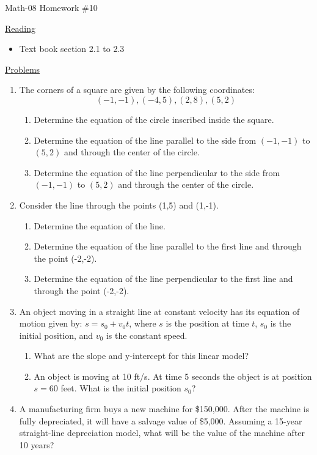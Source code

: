 \documentclass[letterpaper,12pt,fleqn]{article}
\begin{document}
\begin{center}
\Large Math-08 Homework \#10
\end{center}

\vspace{0.5in}

\underline{Reading}

\begin{itemize}
\item Text book section 2.1 to 2.3
\end{itemize}

\underline{Problems}

\begin{enumerate}
\item The corners of a square are given by the following coordinates:
  \[(-1,-1), (-4,5), (2,8), (5,2)\]
  \begin{enumerate}
  \item Determine the equation of the circle inscribed inside the square.
  \item Determine the equation of the line parallel to the side from
    $(-1,-1)$ to $(5,2)$ and through the center of the circle.
  \item Determine the equation of the line perpendicular to the side from
    $(-1,-1)$ to $(5,2)$ and through the center of the circle.
  \end{enumerate}

\item Consider the line through the points (1,5) and (1,-1).
  \begin{enumerate}
  \item Determine the equation of the line.
  \item Determine the equation of the line parallel to the first line and
    through the point (-2,-2).
  \item Determine the equation of the line perpendicular to the first line
    and through the point (-2,-2).
  \end{enumerate}

\item An object moving in a straight line at constant velocity has its
  equation of motion given by: $s=s_0+v_0t$, where $s$ is the position at time
  $t$, $s_0$ is the initial position, and $v_0$ is the constant speed.
  \begin{enumerate}
    \item What are the slope and y-intercept for this linear model?
    \item An object is moving at 10 ft/s. At time 5 seconds the object is
      at position $s=60$ feet. What is the initial position $s_0$?
  \end{enumerate}

\item A manufacturing firm buys a new machine for \$150,000. After the machine
  is fully depreciated, it will have a salvage value of \$5,000. Assuming a
  15-year straight-line depreciation model, what will be the value of the
  machine after 10 years?
\end{enumerate}
\end{document}
